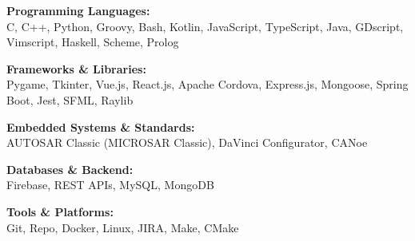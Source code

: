 \documentclass[a4paper,10pt]{article}
\begin{document}
\begin{multicols}{2}
\noindent
\textbf{Programming Languages:} \\
C, C++, Python, Groovy, Bash, Kotlin, JavaScript, TypeScript, Java, GDscript, Vimscript, Haskell, Scheme, Prolog

\vspace{0.3em}

\textbf{Frameworks \& Libraries:} \\
Pygame, Tkinter, Vue.js, React.js, Apache Cordova, Express.js, Mongoose, Spring Boot, Jest, SFML, Raylib

\vspace{0.3em}

\textbf{Embedded Systems \& Standards:} \\
AUTOSAR Classic (MICROSAR Classic), DaVinci Configurator, CANoe

\vspace{0.3em}

\textbf{Databases \& Backend:} \\
Firebase, REST APIs, MySQL, MongoDB

\vspace{0.3em}

\textbf{Tools \& Platforms:} \\
Git, Repo, Docker, Linux, JIRA, Make, CMake

\end{multicols}
\end{document}
